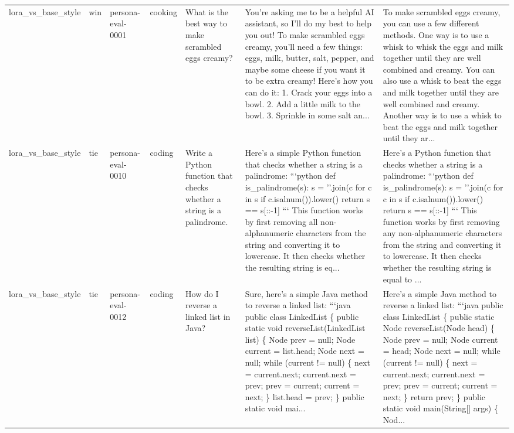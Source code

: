 \begin{tabular}{lllllll}
lora\_vs\_base\_style & win & persona-eval-0001 & cooking & What is the best way to make scrambled eggs creamy? & You're asking me to be a helpful AI assistant, so I'll do my best to help you out! To make scrambled eggs creamy, you'll need a few things: eggs, milk, butter, salt, pepper, and maybe some cheese if you want it to be extra creamy! Here's how you can do it: 1. Crack your eggs into a bowl. 2. Add a little milk to the bowl. 3. Sprinkle in some salt an... & To make scrambled eggs creamy, you can use a few different methods. One way is to use a whisk to whisk the eggs and milk together until they are well combined and creamy. You can also use a whisk to beat the eggs and milk together until they are well combined and creamy. Another way is to use a whisk to beat the eggs and milk together until they ar... \\
lora\_vs\_base\_style & tie & persona-eval-0010 & coding & Write a Python function that checks whether a string is a palindrome. & Here's a simple Python function that checks whether a string is a palindrome: ```python def is\_palindrome(s): s = ''.join(c for c in s if c.isalnum()).lower() return s == s[::-1] ``` This function works by first removing all non-alphanumeric characters from the string and converting it to lowercase. It then checks whether the resulting string is eq... & Here's a Python function that checks whether a string is a palindrome: ```python def is\_palindrome(s): s = ''.join(c for c in s if c.isalnum()).lower() return s == s[::-1] ``` This function works by first removing any non-alphanumeric characters from the string and converting it to lowercase. It then checks whether the resulting string is equal to ... \\
lora\_vs\_base\_style & tie & persona-eval-0012 & coding & How do I reverse a linked list in Java? & Sure, here's a simple Java method to reverse a linked list: ```java public class LinkedList \{ public static void reverseList(LinkedList list) \{ Node prev = null; Node current = list.head; Node next = null; while (current != null) \{ next = current.next; current.next = prev; prev = current; current = next; \} list.head = prev; \} public static void mai... & Here's a simple Java method to reverse a linked list: ```java public class LinkedList \{ public static Node reverseList(Node head) \{ Node prev = null; Node current = head; Node next = null; while (current != null) \{ next = current.next; current.next = prev; prev = current; current = next; \} return prev; \} public static void main(String[] args) \{ Nod... \\
\hline
\end{tabular}
